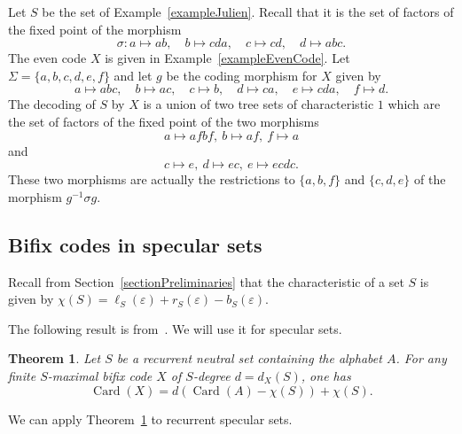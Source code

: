\documentclass[preprint,12pt]{elsarticle}
\newtheorem{theorem}{Theorem}
\DeclareMathOperator{\Card}{Card}
\numberwithin{theorem}{section}
\numberwithin{equation}{section}
\numberwithin{figure}{section}
\numberwithin{table}{section}
\begin{document}
\begin{example}
Let $S$ be the set of Example~\ref{exampleJulien}. 
Recall that it is the set of
factors of the fixed point of the morphism
\begin{displaymath}
\sigma:a\mapsto ab,\quad b\mapsto cda,\quad c\mapsto cd,\quad d\mapsto abc.
\end{displaymath}
The even code $X$
is given in Example~\ref{exampleEvenCode}. Let $\Sigma=\{a,b,c,d,e,f\}$
and let $g$ be the
coding morphism for $X$ given by 
\begin{displaymath}
a\mapsto abc,\quad b\mapsto ac,\quad c\mapsto b,\quad d\mapsto ca,\quad e\mapsto cda,\quad f\mapsto d.
\end{displaymath}
The decoding of $S$
by $X$ is a union of two tree sets of characteristic $1$ which are the set of factors of the
fixed point of the two morphisms
\begin{displaymath}
a\mapsto afbf,\ b\mapsto af,\ f\mapsto a
\end{displaymath}
and 
\begin{displaymath}
c\mapsto e,\ d\mapsto ec,\ e\mapsto ecdc.
\end{displaymath}
These two morphisms are actually the restrictions to $\{a,b,f\}$ and $\{c,d,e\}$
of
the morphism $g^{-1}\sigma g$.
\end{example}





\subsection{Bifix codes in specular sets}
Recall from Section~\ref{sectionPreliminaries} that the characteristic of a set $S$ is given by $\chi(S) = \ell_S(\varepsilon) + r_S(\varepsilon) - b_S(\varepsilon)$.

The following result is from~\cite{DolcePerrin2016}.
We will use it for specular sets.

\begin{theorem}
\label{theoremCardinality}
Let $S$ be a recurrent neutral set containing the alphabet $A$.
For any finite $S$-maximal bifix code $X$ of $S$-degree $d=d_X(S)$, one has
\begin{displaymath}
\Card(X)=d(\Card(A)-\chi(S))+\chi(S).
\end{displaymath}
\end{theorem}

We can apply Theorem~\ref{theoremCardinality} to recurrent specular sets.
\end{document}
